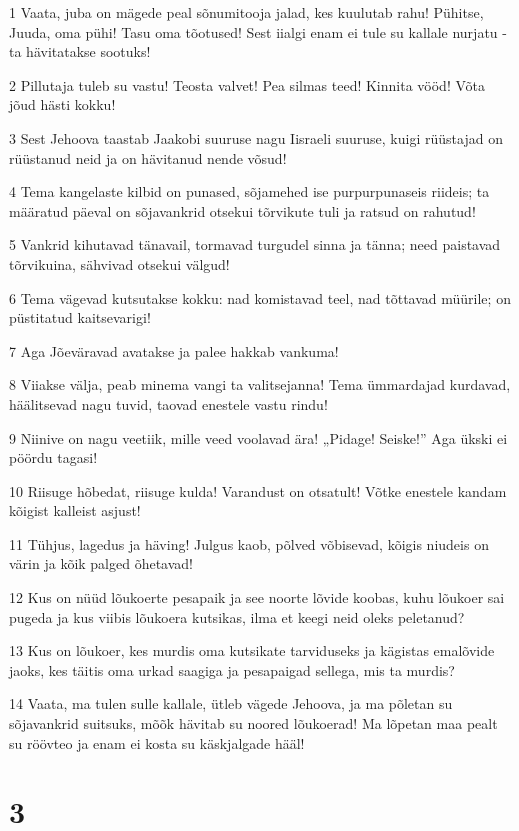 \par 1 Vaata, juba on mägede peal sõnumitooja jalad, kes kuulutab rahu! Pühitse, Juuda, oma pühi! Tasu oma tõotused! Sest iialgi enam ei tule su kallale nurjatu - ta hävitatakse sootuks!
\par 2 Pillutaja tuleb su vastu! Teosta valvet! Pea silmas teed! Kinnita vööd! Võta jõud hästi kokku!
\par 3 Sest Jehoova taastab Jaakobi suuruse nagu Iisraeli suuruse, kuigi rüüstajad on rüüstanud neid ja on hävitanud nende võsud!
\par 4 Tema kangelaste kilbid on punased, sõjamehed ise purpurpunaseis riideis; ta määratud päeval on sõjavankrid otsekui tõrvikute tuli ja ratsud on rahutud!
\par 5 Vankrid kihutavad tänavail, tormavad turgudel sinna ja tänna; need paistavad tõrvikuina, sähvivad otsekui välgud!
\par 6 Tema vägevad kutsutakse kokku: nad komistavad teel, nad tõttavad müürile; on püstitatud kaitsevarigi!
\par 7 Aga Jõeväravad avatakse ja palee hakkab vankuma!
\par 8 Viiakse välja, peab minema vangi ta valitsejanna! Tema ümmardajad kurdavad, häälitsevad nagu tuvid, taovad enestele vastu rindu!
\par 9 Niinive on nagu veetiik, mille veed voolavad ära! „Pidage! Seiske!” Aga ükski ei pöördu tagasi!
\par 10 Riisuge hõbedat, riisuge kulda! Varandust on otsatult! Võtke enestele kandam kõigist kalleist asjust!
\par 11 Tühjus, lagedus ja häving! Julgus kaob, põlved võbisevad, kõigis niudeis on värin ja kõik palged õhetavad!
\par 12 Kus on nüüd lõukoerte pesapaik ja see noorte lõvide koobas, kuhu lõukoer sai pugeda ja kus viibis lõukoera kutsikas, ilma et keegi neid oleks peletanud?
\par 13 Kus on lõukoer, kes murdis oma kutsikate tarviduseks ja kägistas emalõvide jaoks, kes täitis oma urkad saagiga ja pesapaigad sellega, mis ta murdis?
\par 14 Vaata, ma tulen sulle kallale, ütleb vägede Jehoova, ja ma põletan su sõjavankrid suitsuks, mõõk hävitab su noored lõukoerad! Ma lõpetan maa pealt su röövteo ja enam ei kosta su käskjalgade hääl!


\chapter{3}

